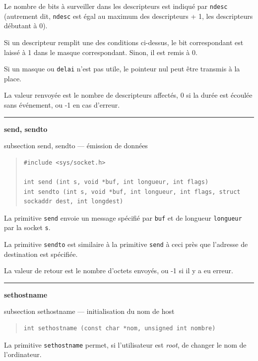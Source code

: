 \documentclass [twoside] {report}
\newcommand {\primitive} [1]
    {
	\phantomsection
	{\large \textbf {#1}}
	\addcontentsline {toc} {subsection} {#1}
    }
\newcommand {\separation}
    {
	\vspace {5mm}
	\nopagebreak
	\hrule
    }
\begin{document}
Le nombre de bits à surveiller dans les descripteurs est
indiqué par \texttt {ndesc} (autrement dit, \texttt {ndesc}
est égal au maximum des descripteurs + 1, les descripteurs
débutant à 0).

Si un descripteur remplit une des conditions ci-dessus, le
bit correspondant est laissé à 1 dans le masque
correspondant. Sinon, il est remis à 0.

Si un masque ou \texttt {delai} n'est pas utile, le pointeur
nul peut être transmis à la place.

La valeur renvoyée est le nombre de descripteurs affectés,
0 si la durée est écoulée sans événement, ou -1 en cas
d'erreur.



\separation
\primitive {send, sendto} --- émission de données

\begin {quote}
\begin {verbatim}
#include <sys/socket.h>

int send (int s, void *buf, int longueur, int flags)
int sendto (int s, void *buf, int longueur, int flags, struct sockaddr dest, int longdest)
\end{verbatim}
\end {quote}

La primitive \texttt {send} envoie un message spécifié par
\texttt {buf} et de longueur \texttt {longueur} par la socket \texttt {s}.

La primitive \texttt {sendto} est similaire à la primitive
\texttt {send} à ceci près que l'adresse de destination est
spécifiée.

La valeur de retour est le nombre d'octets envoyés, ou -1 si
il y a eu erreur.



\separation
\primitive {sethostname} --- initialisation du nom de host

\begin {quote}
\begin {verbatim}
int sethostname (const char *nom, unsigned int nombre)
\end{verbatim}
\end {quote}

La primitive \texttt {sethostname} permet, si l'utilisateur est
\emph {root}, de changer le nom de l'ordinateur.

\end{document}

